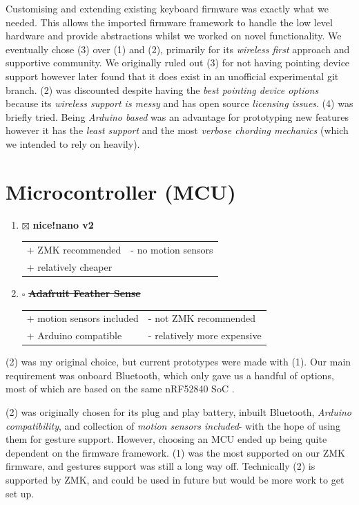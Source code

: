 \documentclass[logo,bsc,singlespacing,parskip]{infthesis}
\begin{document}
Customising and extending existing keyboard firmware was exactly what we needed.
This allows the imported firmware framework to handle the low level hardware and provide abstractions whilst we worked on novel functionality.
We eventually chose (3) over (1) and (2), primarily for its \emph{wireless first} approach and supportive community.
We originally ruled out (3) for not having pointing device support however later found that it does exist in an unofficial experimental git branch.
(2) was discounted despite having the \emph{best pointing device options} because its \emph{wireless support is messy} and has open source \emph{licensing issues}.
(4) was briefly tried.
Being \emph{Arduino based} was an advantage for prototyping new features however it has the \emph{least support} and the most \emph{verbose chording mechanics} (which we intended to rely on heavily).
\section{Microcontroller (MCU)}
\label{sec:org7d9c761}
\begin{enumerate}
\item{$\boxtimes$} \textbf{nice!nano v2} \autocite{NiceNanoNice}
\begin{longtable}{|p{6.25cm}|p{6.25cm}|}
\hline
+ ZMK recommended & - no motion sensors\\
+ relatively cheaper & \\
\hline
\end{longtable}

\item{$\square$} \sout{\textbf{Adafruit Feather Sense}} \autocite{AdafruitFeatherNRF52840}
\begin{longtable}{|p{6.25cm}|p{6.25cm}|}
\hline
+ motion sensors included & - not ZMK recommended\\
+ Arduino compatible & - relatively more expensive\\
\hline
\end{longtable}
\end{enumerate}

(2) was my original choice, but current prototypes were made with (1).
Our main requirement was onboard Bluetooth, which only gave us a handful of options, most of which are based on the same nRF52840 SoC \autocite{semionductorNRF52840NordicSemiconductor2021}.

(2) was originally chosen for its plug and play battery, inbuilt Bluetooth, \emph{Arduino compatibility}, and collection of \emph{motion sensors included}- with the hope of using them for gesture support.
However, choosing an MCU ended up being quite dependent on the firmware framework.
(1) was the most supported on our ZMK firmware, and gestures support was still a long way off.
Technically (2) is supported by ZMK, and could be used in future but would be more work to get set up.
\end{document}
